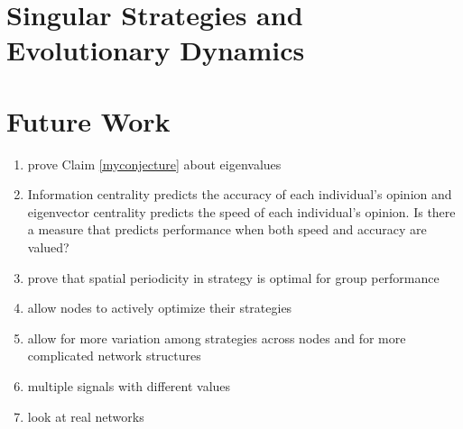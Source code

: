 \documentclass{article}
\begin{document}

\section{Singular Strategies and Evolutionary Dynamics}




\section{Future Work}

\begin{enumerate}
\item prove Claim \ref{myconjecture} about eigenvalues
\item Information centrality predicts the accuracy of each individual's opinion and eigenvector centrality predicts the speed of each individual's opinion.  Is there a measure that predicts performance when both speed and accuracy are valued?
\item prove that spatial periodicity in strategy is optimal for group performance
\item allow nodes to actively optimize their strategies 
 \item allow for more variation among strategies across nodes and for more complicated network structures
  \item multiple signals with different values 
\item look at real networks
\end{enumerate}

%
\end{document}
